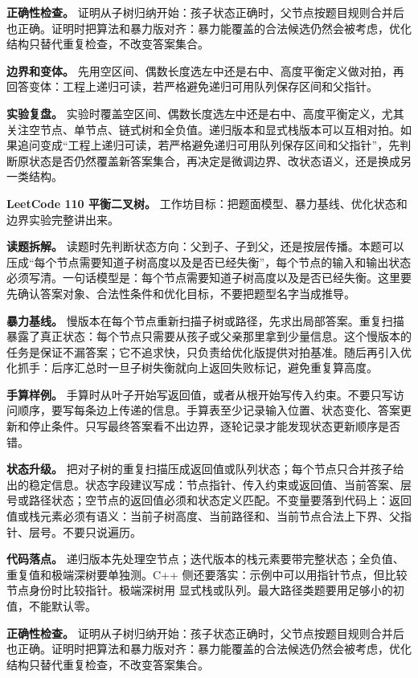 \textbf{正确性检查。} 证明从子树归纳开始：孩子状态正确时，父节点按题目规则合并后也正确。证明时把算法和暴力版对齐：暴力能覆盖的合法候选仍然会被考虑，优化结构只替代重复检查，不改变答案集合。

\textbf{边界和变体。} 先用空区间、偶数长度选左中还是右中、高度平衡定义做对拍，再回答变体：工程上递归可读，若严格避免递归可用队列保存区间和父指针。

\textbf{实验复盘。} 实验时覆盖空区间、偶数长度选左中还是右中、高度平衡定义，尤其关注空节点、单节点、链式树和全负值。递归版本和显式栈版本可以互相对拍。如果追问变成“工程上递归可读，若严格避免递归可用队列保存区间和父指针”，先判断原状态是否仍然覆盖新答案集合，再决定是微调边界、改状态语义，还是换成另一类结构。

\noindent\textbf{LeetCode 110 平衡二叉树。} 工作坊目标：把题面模型、暴力基线、优化状态和边界实验完整讲出来。

\textbf{读题拆解。} 读题时先判断状态方向：父到子、子到父，还是按层传播。本题可以压成“每个节点需要知道子树高度以及是否已经失衡”，每个节点的输入和输出状态必须写清。一句话模型是：每个节点需要知道子树高度以及是否已经失衡。这里要先确认答案对象、合法性条件和优化目标，不要把题型名字当成推导。

\textbf{暴力基线。} 慢版本在每个节点重新扫描子树或路径，先求出局部答案。重复扫描暴露了真正状态：每个节点只需要从孩子或父亲那里拿到少量信息。这个慢版本的任务是保证不漏答案；它不追求快，只负责给优化版提供对拍基准。随后再引入优化抓手：后序汇总时一旦子树失衡就向上返回失败标记，避免重复算高度。

\textbf{手算样例。} 手算时从叶子开始写返回值，或者从根开始写传入约束。不要只写访问顺序，要写每条边上传递的信息。手算表至少记录输入位置、状态变化、答案更新和停止条件。只写最终答案看不出边界，逐轮记录才能发现状态更新顺序是否错。

\textbf{状态升级。} 把对子树的重复扫描压成返回值或队列状态；每个节点只合并孩子给出的稳定信息。状态字段建议写成：节点指针、传入约束或返回值、当前答案、层号或路径状态；空节点的返回值必须和状态定义匹配。不变量要落到代码上：返回值或栈元素必须有语义：当前子树高度、当前路径和、当前节点合法上下界、父指针、层号。不要只说遍历。

\textbf{代码落点。} 递归版本先处理空节点；迭代版本的栈元素要带完整状态；全负值、重复值和极端深树要单独测。C++ 侧还要落实：示例中可以用指针节点，但比较节点身份时比较指针。极端深树用  显式栈或队列。最大路径类题要用足够小的初值，不能默认零。

\textbf{正确性检查。} 证明从子树归纳开始：孩子状态正确时，父节点按题目规则合并后也正确。证明时把算法和暴力版对齐：暴力能覆盖的合法候选仍然会被考虑，优化结构只替代重复检查，不改变答案集合。

